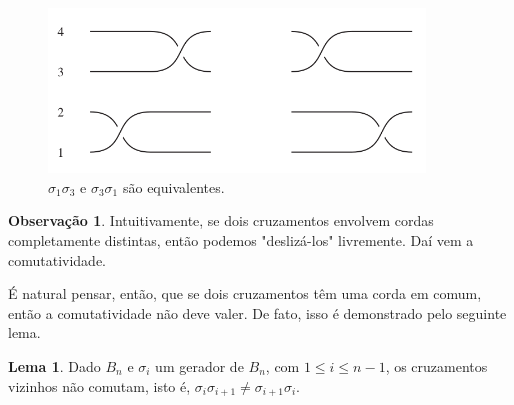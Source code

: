 \documentclass[a4paper,portuguese,11pt,twoside, leqno]{book}
\theoremstyle{definition}
\newtheorem{lemma}[theorem]{Lema}
\newtheorem{remark}{Observação}[section]
\begin{document}
	\begin{figure}[H]
		\captionsetup{justification=centering}
		\begin{center}
			\includegraphics[width=10cm]{Images/comutatividade.png}
		\end{center}\caption{$\sigma_1\sigma_3$ e $\sigma_3\sigma_1$ são equivalentes.}\label{comutatividade de trancas}
	\end{figure}
	
	\par\vspace{0.3cm}
	
	\begin{remark}
		Intuitivamente, se dois cruzamentos envolvem cordas completamente distintas, então podemos "deslizá-los" livremente. Daí vem a comutatividade.
	\end{remark}
	
	\par\vspace{0.3cm} É natural pensar, então, que se dois cruzamentos têm uma corda em comum, então a comutatividade não deve valer. De fato, isso é demonstrado pelo seguinte lema.
	
	\begin{lemma}
		\label{vizinhos nao comutam}
		Dado $B_n$ e $\sigma_i$ um gerador de $B_n$, com $1\leq i\leq n-1$, os cruzamentos vizinhos não comutam, isto é, $\sigma_i\sigma_{i+1}\neq\sigma_{i+1}\sigma_i$.
	\end{lemma}
	
\end{document}
